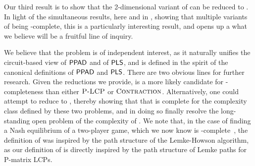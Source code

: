 Our third result is to show that the 2-dimensional variant of \CM can be reduced to \EOPL. In light of the simultaneous results, here and in \cite{DTZ17}, showing that multiple variants of \CM being \CLS-complete, this is a particularly interesting result, and opens up a what we believe will be a fruitful line of inquiry.

We believe that the \EOPL problem is of independent interest, as it naturally
unifies the circuit-based view of $\mathsf{PPAD}$ and of $\mathsf{PLS}$, and is defined
in the spirit of the canonical definitions of $\mathsf{PPAD}$ and $\mathsf{PLS}$.  There
are two obvious lines for further research.  Given the reductions we provide,
\EOPL is a more likely candidate for \CLS-completeness than either $\textsc{P-LCP}$ or $\textsc{Contraction}$.
Alternatively, one could attempt to reduce \EOPL to \PLCP, thereby showing that
that \PLCP is complete for the complexity class defined by these two problems,
and in doing so finally resolve the long-standing open problem of the complexity
of \PLCP.
We note that, in the case of finding a Nash equilibrium of a two-player game,
which we now know is
\PPAD-complete~\cite{chen2009settling,daskalakis2009complexity}, the definition
of \PPAD was inspired by the path structure of the Lemke-Howson algorithm, as
our definition of \EOPL is directly inspired by the path structure of Lemke
paths for P-matrix LCPs.






